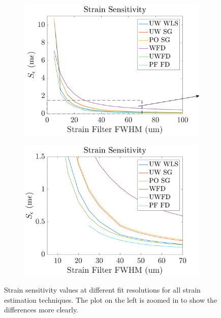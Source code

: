 \begin{figure}[b!]
	\centering
    \begin{subfigure}{0.49\textwidth}
    	\centering
        \includegraphics[width=\textwidth]{figures/sensitivity_lr0_arrow.png}
    \end{subfigure}
    \begin{subfigure}{0.49\textwidth}
    	\centering
        \includegraphics[width=\textwidth]{figures/sensitivity_lr0_zoom.png}
    \end{subfigure}
    \caption{Strain sensitivity values at different fit resolutions for all strain estimation techniques. The plot on the left is zoomed in to show the differences more clearly.}
	\label{sensitivity_1}
\end{figure}

